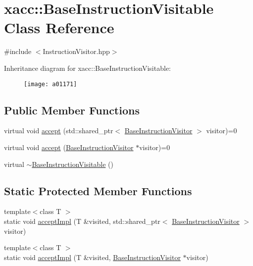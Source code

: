 \hypertarget{a01171}{}\section{xacc\+:\+:Base\+Instruction\+Visitable Class Reference}
\label{a01171}


{\ttfamily \#include $<$Instruction\+Visitor.\+hpp$>$}

Inheritance diagram for xacc\+:\+:Base\+Instruction\+Visitable\+:\begin{figure}[H]
\begin{center}
\leavevmode
\texttt{[image: a01171]}
\end{center}
\end{figure}
\subsection*{Public Member Functions}
\begin{DoxyCompactItemize}
\item 
virtual void \hyperlink{a01171_a4ae295a7f83d57c6f1f912adc90274ea}{accept} (std\+::shared\+\_\+ptr$<$ \hyperlink{a01163}{Base\+Instruction\+Visitor} $>$ visitor)=0
\item 
virtual void \hyperlink{a01171_ad6b9ad95c14580cc86ca87cd464262c3}{accept} (\hyperlink{a01163}{Base\+Instruction\+Visitor} $\ast$visitor)=0
\item 
virtual \hyperlink{a01171_a3a291d247b18ea7620dd8d97dfb595f4}{$\sim$\+Base\+Instruction\+Visitable} ()
\end{DoxyCompactItemize}
\subsection*{Static Protected Member Functions}
\begin{DoxyCompactItemize}
\item 
{\footnotesize template$<$class T $>$ }\\static void \hyperlink{a01171_a2f18b9fcb48f42d190a9f5180b7b59c5}{accept\+Impl} (T \&visited, std\+::shared\+\_\+ptr$<$ \hyperlink{a01163}{Base\+Instruction\+Visitor} $>$ visitor)
\item 
{\footnotesize template$<$class T $>$ }\\static void \hyperlink{a01171_a80c7bb995faa54644f822fa48176c6cb}{accept\+Impl} (T \&visited, \hyperlink{a01163}{Base\+Instruction\+Visitor} $\ast$visitor)
\end{DoxyCompactItemize}


